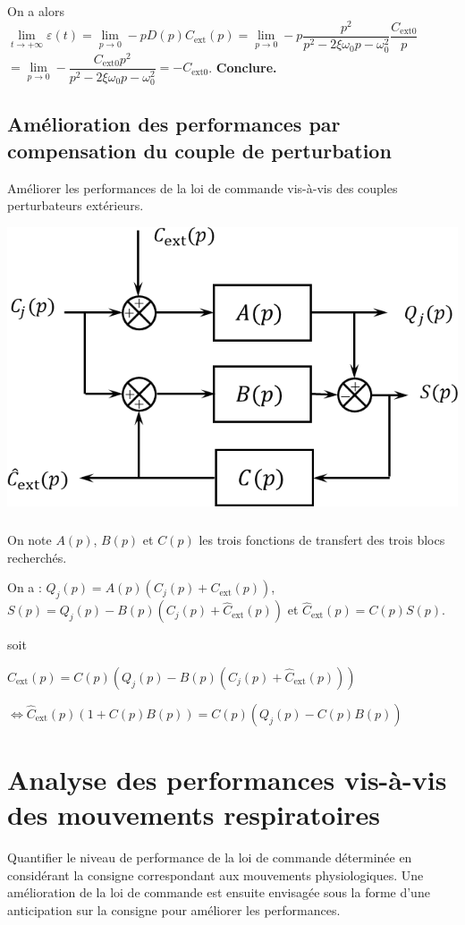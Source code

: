 \documentclass[10pt,fleqn]{article} %
\begin{document}
On a alors $\lim\limits_{t\to +\infty} \varepsilon(t) = \lim\limits_{p\to 0} -pD(p)C_{\text{ext}}(p)= \lim\limits_{p\to 0} -p\dfrac{p^2}{p^2-2\xi\omega_0 p-\omega_0^2 }\dfrac{C_{\text{ext} 0}}{p}$
$= \lim\limits_{p\to 0} -\dfrac{C_{\text{ext} 0}p^2}{p^2-2\xi\omega_0 p-\omega_0^2 }  = -C_{\text{ext} 0}$.
\textbf{Conclure.}


\subsection{Amélioration des performances par compensation du couple de perturbation}
\begin{obj}
Améliorer les performances de la loi de commande vis-à-vis des couples perturbateurs extérieurs.
\end{obj}

\begin{center}
\includegraphics[width=.4\linewidth]{images/fig_04}
\end{center}

\subparagraph{}%
On note $A(p)$, $B(p)$ et $C(p)$ les trois fonctions de transfert des trois blocs recherchés. 


On a : $Q_j(p)=A(p)\left(C_j(p)+C_{\text{ext}}(p)\right)$, 
$S(p)=Q_j(p)-B(p)\left( C_j(p)+\hat{C}_{\text{ext}}(p) \right)$
et  $\hat{C}_{\text{ext}}(p)=C(p)S(p)$.

 soit 

$\hat{C}_{\text{ext}}(p)=C(p)\left(Q_j(p)-B(p)\left( C_j(p)+\hat{C}_{\text{ext}}(p) \right)\right)$

$\Leftrightarrow \hat{C}_{\text{ext}}(p) \left(1+ C(p)B(p)\right)=C(p)\left(Q_j(p)-C(p)B(p) \right)$

\subparagraph{}%

\subparagraph{}%

\subparagraph{}%


\section{Analyse des performances vis-à-vis des mouvements respiratoires}
\begin{obj}
Quantifier le niveau de performance de la loi de commande déterminée en considérant la consigne
correspondant aux mouvements physiologiques. Une amélioration de la loi de commande est ensuite
envisagée sous la forme d’une anticipation sur la consigne pour améliorer les performances.
\end{obj}
\end{document}
